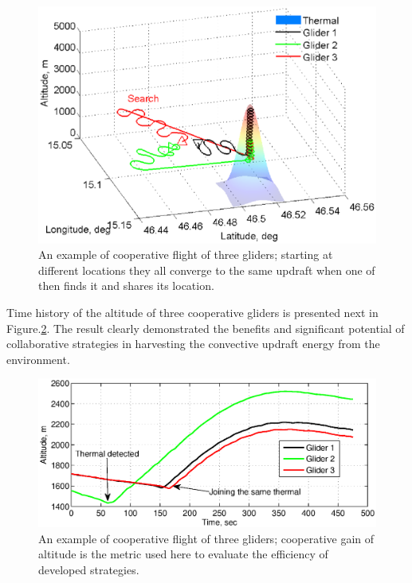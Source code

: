 \documentclass{ifacconf}
\begin{document}
\begin{figure}[thpb]
  \centering
  \includegraphics[scale=0.45]{Figures/paths_cooperative_flight.eps}
  \caption{An example of cooperative flight of three gliders; starting at different locations they all converge to the same updraft when one of then finds it and shares its location.}
  \label{fig:CoopFlightPaths}
\end{figure}
Time history of the altitude of three cooperative gliders is presented next in Figure.\ref{fig:CoopFlightHeight}. The result clearly demonstrated the benefits and significant potential of collaborative strategies in harvesting the convective updraft energy from the environment.

\begin{figure}[thpb]
  \centering
  \includegraphics[scale=0.45]{Figures/Coop_gain_altitude.eps}
  \caption{An example of cooperative flight of three gliders; cooperative gain of altitude is the metric used here to evaluate the efficiency of developed strategies.}
  \label{fig:CoopFlightHeight}
\end{figure}
\end{document}
